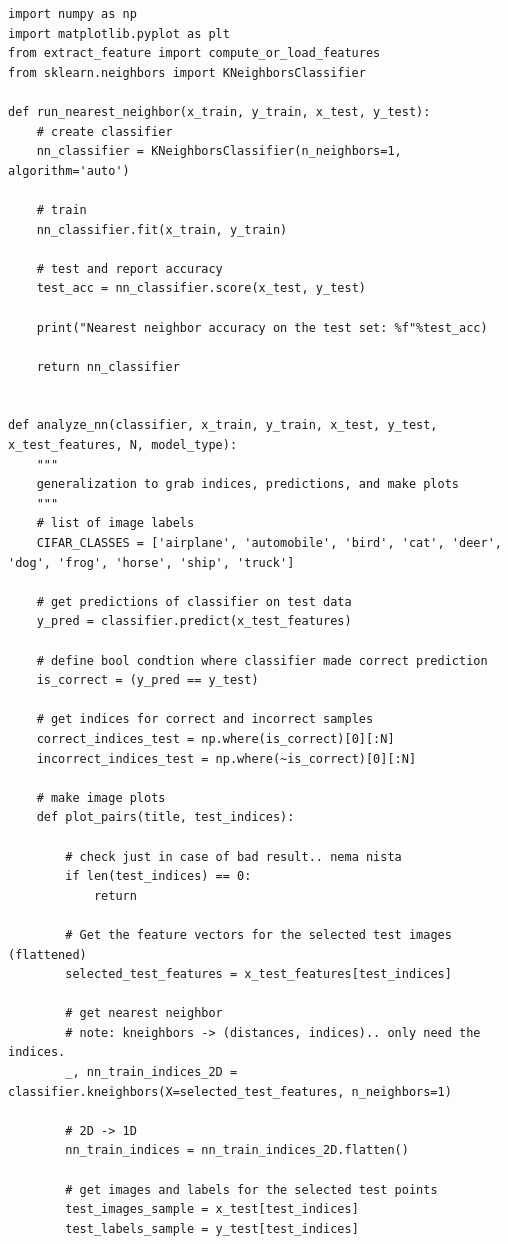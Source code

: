 \documentclass{article}
\begin{document}
\begin{lstlisting}
import numpy as np
import matplotlib.pyplot as plt
from extract_feature import compute_or_load_features
from sklearn.neighbors import KNeighborsClassifier

def run_nearest_neighbor(x_train, y_train, x_test, y_test):
    # create classifier    
    nn_classifier = KNeighborsClassifier(n_neighbors=1, algorithm='auto')

    # train 
    nn_classifier.fit(x_train, y_train)

    # test and report accuracy
    test_acc = nn_classifier.score(x_test, y_test)

    print("Nearest neighbor accuracy on the test set: %f"%test_acc)

    return nn_classifier


def analyze_nn(classifier, x_train, y_train, x_test, y_test, x_test_features, N, model_type):
    """
    generalization to grab indices, predictions, and make plots
    """
    # list of image labels
    CIFAR_CLASSES = ['airplane', 'automobile', 'bird', 'cat', 'deer', 'dog', 'frog', 'horse', 'ship', 'truck']

    # get predictions of classifier on test data
    y_pred = classifier.predict(x_test_features)
    
    # define bool condtion where classifier made correct prediction
    is_correct = (y_pred == y_test)
    
    # get indices for correct and incorrect samples
    correct_indices_test = np.where(is_correct)[0][:N]
    incorrect_indices_test = np.where(~is_correct)[0][:N]
    
    # make image plots 
    def plot_pairs(title, test_indices):
        
        # check just in case of bad result.. nema nista
        if len(test_indices) == 0:
            return
            
        # Get the feature vectors for the selected test images (flattened)
        selected_test_features = x_test_features[test_indices]
        
        # get nearest neighbor
        # note: kneighbors -> (distances, indices).. only need the indices.
        _, nn_train_indices_2D = classifier.kneighbors(X=selected_test_features, n_neighbors=1)
        
        # 2D -> 1D
        nn_train_indices = nn_train_indices_2D.flatten()
        
        # get images and labels for the selected test points
        test_images_sample = x_test[test_indices]
        test_labels_sample = y_test[test_indices]
        

\end{lstlisting}
\end{document}
